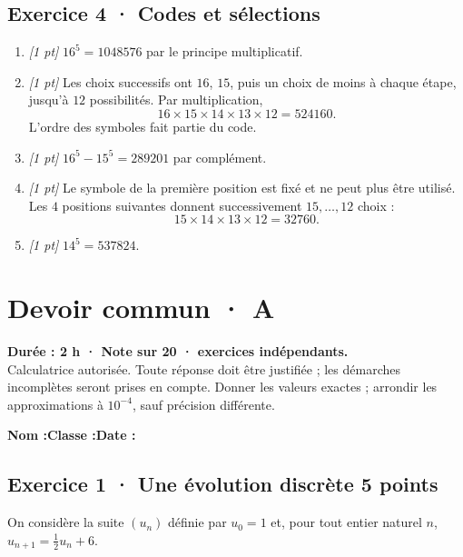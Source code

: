 \subsection*{Exercice 4 · Codes et sélections}\begin{enumerate}

\item \textit{[1 pt]} $16^5=1048576$ par le principe multiplicatif.

\item \textit{[1 pt]} Les choix successifs ont $16$, $15$, puis un choix de moins à chaque étape, jusqu'à $12$ possibilités. Par multiplication,
\[16\times15\times14\times13\times12=524160.\]
L'ordre des symboles fait partie du code.

\item \textit{[1 pt]} $16^5-15^5=289201$ par complément.

\item \textit{[1 pt]} Le symbole de la première position est fixé et ne peut plus être utilisé. Les $4$ positions suivantes donnent successivement $15,\ldots,12$ choix :
\[15\times14\times13\times12=32760.\]

\item \textit{[1 pt]} $14^5=537824$.

\end{enumerate}

\fi

\ifmxteacher

\mxnewpage{}\label{sujet:3-3}

\section*{Devoir commun · A}


\textbf{Durée : 2 h · Note sur 20 ·  exercices indépendants.}\\Calculatrice autorisée. Toute réponse doit être justifiée ; les démarches incomplètes seront prises en compte. Donner les valeurs exactes ; arrondir les approximations à $10^{-4}$, sauf précision différente.

\smallskip\textbf{Nom :}\enspace\dotfill\quad\textbf{Classe :}\enspace\dotfill\quad\textbf{Date :}\enspace\dotfill

\subsection*{Exercice 1 · Une évolution discrète \hfill 5 points}On considère la suite $(u_n)$ définie par $u_0=1$ et, pour tout entier naturel $n$, $u_{n+1}=\frac{1}{2}u_n+6$.

